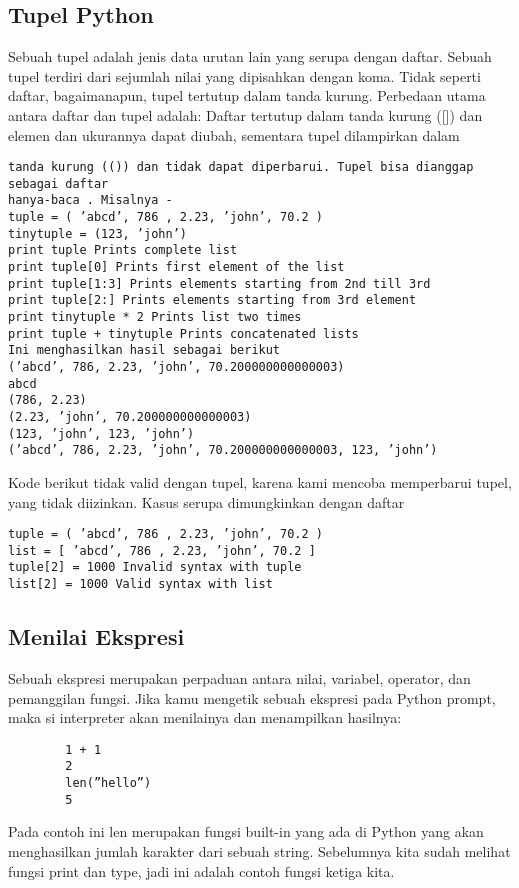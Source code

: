 \begin{enumerate}
\subsection{Tupel Python}
Sebuah tupel adalah jenis data urutan lain yang serupa dengan daftar. Sebuah tupel terdiri dari sejumlah nilai yang dipisahkan dengan koma. Tidak seperti daftar,
bagaimanapun, tupel tertutup dalam tanda kurung.
Perbedaan utama antara daftar dan tupel adalah: Daftar tertutup dalam tanda kurung
([]) dan elemen dan ukurannya dapat diubah, sementara tupel dilampirkan dalam
\begin{verbatim}
tanda kurung (()) dan tidak dapat diperbarui. Tupel bisa dianggap sebagai daftar
hanya-baca . Misalnya -
tuple = ( ’abcd’, 786 , 2.23, ’john’, 70.2 )
tinytuple = (123, ’john’)
print tuple Prints complete list
print tuple[0] Prints first element of the list
print tuple[1:3] Prints elements starting from 2nd till 3rd
print tuple[2:] Prints elements starting from 3rd element
print tinytuple * 2 Prints list two times
print tuple + tinytuple Prints concatenated lists
Ini menghasilkan hasil sebagai berikut
(’abcd’, 786, 2.23, ’john’, 70.200000000000003)
abcd
(786, 2.23)
(2.23, ’john’, 70.200000000000003)
(123, ’john’, 123, ’john’)
(’abcd’, 786, 2.23, ’john’, 70.200000000000003, 123, ’john’)
\end{verbatim}
Kode berikut tidak valid dengan tupel, karena kami mencoba memperbarui tupel,
yang tidak diizinkan. Kasus serupa dimungkinkan dengan daftar 
\begin{verbatim}
tuple = ( ’abcd’, 786 , 2.23, ’john’, 70.2 )
list = [ ’abcd’, 786 , 2.23, ’john’, 70.2 ]
tuple[2] = 1000 Invalid syntax with tuple
list[2] = 1000 Valid syntax with list
\end{verbatim}

\subsection{Menilai Ekspresi}
Sebuah ekspresi merupakan perpaduan antara nilai, variabel, operator, dan pemanggilan fungsi. Jika kamu mengetik sebuah ekspresi pada Python prompt, maka si interpreter akan menilainya dan menampilkan hasilnya:
	\begin{verbatim}
		1 + 1 
		2 
		len(”hello”) 
		5 
	\end{verbatim}
Pada contoh ini len merupakan fungsi built-in yang ada di Python yang akan menghasilkan jumlah karakter dari sebuah string. Sebelumnya kita sudah melihat fungsi print dan type, jadi ini adalah contoh fungsi ketiga kita.


\end{enumerate}
